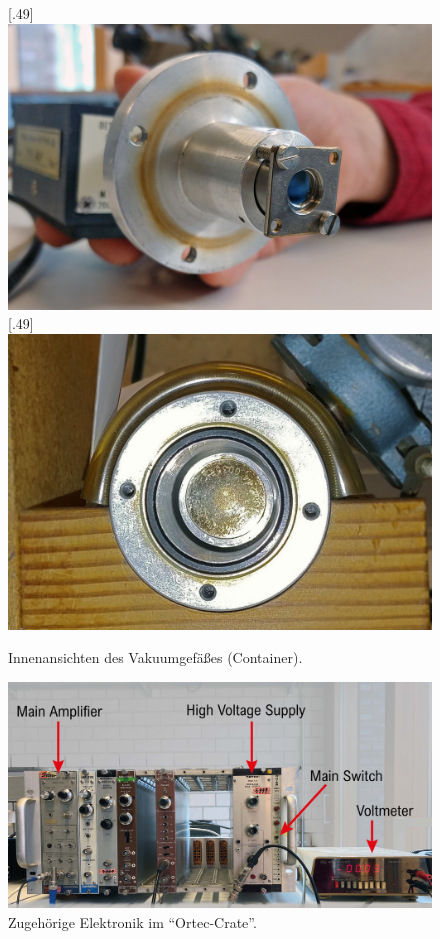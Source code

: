 \begin{figure}
	\centering
	[.49\linewidth]
	{\includegraphics[width=\linewidth]{img/detektor_foto}}
	[.49\linewidth]
	{\includegraphics[width=\linewidth]{img/quelle_foto}}
	\caption{Innenansichten des Vakuumgefäßes (Container).}
\end{figure}
\begin{figure}
	\centering
	\includegraphics[width=0.75\linewidth]{img/setup_3.jpg}
	\caption{Zugehörige Elektronik im \enquote{Ortec-Crate}.}
	\label{fig:setup3}
\end{figure}


